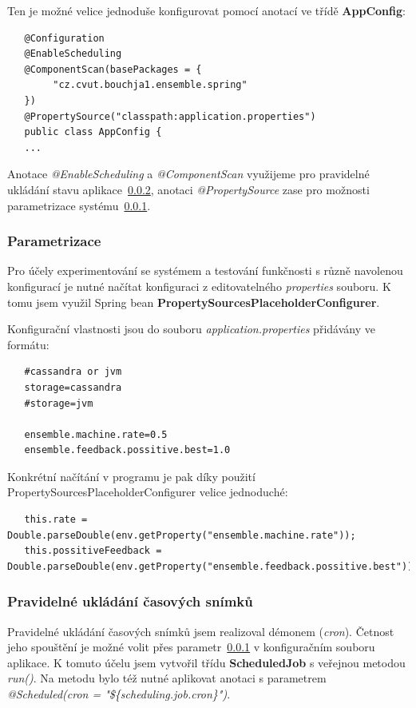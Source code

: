 \documentclass[thesis=M,czech]{FITthesis}[2014/05/07]
\begin{document}
Ten je možné velice jednoduše konfigurovat pomocí anotací ve třídě \textbf{AppConfig}:

\begin{verbatim}
   @Configuration
   @EnableScheduling
   @ComponentScan(basePackages = {
        "cz.cvut.bouchja1.ensemble.spring"
   })
   @PropertySource("classpath:application.properties")
   public class AppConfig {
   ...
\end{verbatim}

Anotace \emph{@EnableScheduling} a \emph{@ComponentScan} využijeme pro pravidelné ukládání stavu aplikace~\ref{task}, anotaci \emph{@PropertySource} zase pro možnosti parametrizace systému~\ref{param}.

\subsubsection{Parametrizace}
\label{param}
Pro účely experimentování se systémem a testování funkčnosti s různě navolenou konfigurací je nutné načítat konfiguraci z editovatelného \emph{properties} souboru. K tomu jsem využil Spring bean \textbf{PropertySourcesPlaceholderConfigurer}.

Konfigurační vlastnosti jsou do souboru \emph{application.properties} přidávány ve formátu:

\begin{verbatim}
   #cassandra or jvm
   storage=cassandra
   #storage=jvm
   
   ensemble.machine.rate=0.5
   ensemble.feedback.possitive.best=1.0
\end{verbatim}

Konkrétní načítání v programu je pak díky použití PropertySourcesPlaceholderConfigurer velice jednoduché:

\begin{verbatim}
   this.rate = Double.parseDouble(env.getProperty("ensemble.machine.rate"));
   this.possitiveFeedback = Double.parseDouble(env.getProperty("ensemble.feedback.possitive.best"));
\end{verbatim}

\subsubsection{Pravidelné ukládání časových snímků}
\label{task}
Pravidelné ukládání časových snímků jsem realizoval démonem (\emph{cron}). Četnost jeho spouštění je možné volit přes parametr~\ref{param} v konfiguračním souboru aplikace. K tomuto účelu jsem vytvořil třídu \textbf{ScheduledJob} s veřejnou metodou \emph{run()}. Na metodu bylo též nutné aplikovat anotaci s parametrem \emph{@Scheduled(cron = "\$\{scheduling.job.cron\}")}.
\end{document}
